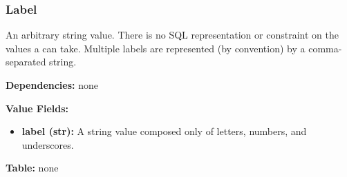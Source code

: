 \subsubsection{Label}
\label{unit:Label}

An arbitrary string value.  There is no SQL representation or
constraint on the values a  can take.  Multiple labels
are represented (by convention) by a comma-separated string.

\textbf{Dependencies:} none

\textbf{Value Fields:}
\begin{itemize}
  \item \textbf{label (str):}
      A string value composed only of letters, numbers, and underscores.
\end{itemize}

\textbf{Table:} none
